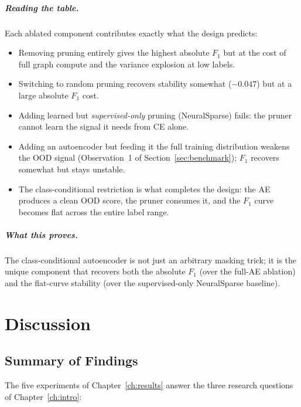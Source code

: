 \documentclass[11pt,a4paper]{report}
\theoremstyle{definition}
\theoremstyle{remark}
\begin{document}
\paragraph{Reading the table.}
Each ablated component contributes exactly what the design predicts:
\begin{itemize}[leftmargin=1.6em]
\item Removing pruning entirely gives the highest absolute $F_1$ but at
the cost of full graph compute and the variance explosion at low labels.
\item Switching to random pruning recovers stability somewhat
($-0.047$) but at a large absolute $F_1$ cost.
\item Adding learned but \emph{supervised-only} pruning (NeuralSparse)
fails: the pruner cannot learn the signal it needs from CE alone.
\item Adding an autoencoder but feeding it the full training distribution
weakens the OOD signal (Observation~1 of Section~\ref{sec:benchmark});
$F_1$ recovers somewhat but stays unstable.
\item The class-conditional restriction is what completes the design:
the AE produces a clean OOD score, the pruner consumes it, and the
$F_1$ curve becomes flat across the entire label range.
\end{itemize}

\paragraph{What this proves.}
The class-conditional autoencoder is not just an arbitrary masking trick;
it is the unique component that recovers both the absolute $F_1$
(over the full-AE ablation) and the flat-curve stability
(over the supervised-only NeuralSparse baseline).

\chapter{Discussion}
\label{ch:discussion}

\section{Summary of Findings}

The five experiments of Chapter~\ref{ch:results} answer the three
research questions of Chapter~\ref{ch:intro}:
\end{document}
